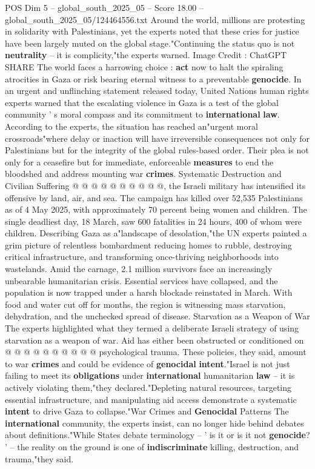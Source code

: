 \begin{textsample}{POS Dim 5 – global\_south\_2025\_05 – Score 18.00 – global\_south\_2025\_05/124464556.txt}  \label{ex:f5_pos_192}
Around the world, millions are protesting in solidarity with Palestinians, yet the experts noted that these cries for justice have been largely muted on the global stage."Continuing the status quo is not \textbf{neutrality} -- it is complicity,"the experts warned.
Image Credit : ChatGPT SHARE The world faces a harrowing choice : \textbf{act} now to halt the spiraling atrocities in Gaza or risk bearing eternal witness to a preventable \textbf{genocide}.
In an urgent and unflinching statement released today, United Nations human rights experts warned that the escalating violence in Gaza is a test of the global community ' s moral compass and its commitment to \textbf{international} \textbf{law}.
According to the experts, the situation has reached an"urgent moral crossroads"where delay or inaction will have irreversible consequences not only for Palestinians but for the integrity of the global rules-based order.
Their plea is not only for a ceasefire but for immediate, enforceable \textbf{measures} to end the bloodshed and address mounting war \textbf{crimes}.
Systematic Destruction and Civilian Suffering @ @ @ @ @ @ @ @ @ @, the Israeli military has intensified its offensive by land, air, and sea.
The campaign has killed over 52,535 Palestinians as of 4 May 2025, with approximately 70 percent being women and children.
The single deadliest day, 18 March, saw 600 fatalities in 24 hours, 400 of whom were children.
Describing Gaza as a"landscape of desolation,"the UN experts painted a grim picture of relentless bombardment reducing homes to rubble, destroying critical infrastructure, and transforming once-thriving neighborhoods into wastelands.
Amid the carnage, 2.1 million survivors face an increasingly unbearable humanitarian crisis.
Essential services have collapsed, and the population is now trapped under a harsh blockade reinstated in March.
With food and water cut off for months, the region is witnessing mass starvation, dehydration, and the unchecked spread of disease.
Starvation as a Weapon of War The experts highlighted what they termed a deliberate Israeli strategy of using starvation as a weapon of war.
Aid has either been obstructed or conditioned on @ @ @ @ @ @ @ @ @ @ psychological trauma.
These policies, they said, amount to war \textbf{crimes} and could be evidence of \textbf{genocidal} \textbf{intent}."Israel is not just failing to meet its \textbf{obligations} under \textbf{international} humanitarian \textbf{law} -- it is actively violating them,"they declared."Depleting natural resources, targeting essential infrastructure, and manipulating aid access demonstrate a systematic \textbf{intent} to drive Gaza to collapse."War Crimes and \textbf{Genocidal} Patterns The \textbf{international} community, the experts insist, can no longer hide behind debates about definitions."While States debate terminology -- ' is it or is it not \textbf{genocide}? ' -- the reality on the ground is one of \textbf{indiscriminate} killing, destruction, and trauma,"they said.

\end{textsample}
